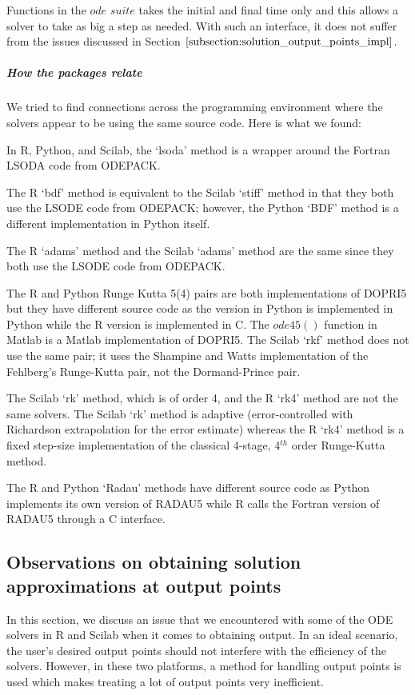 Functions in the $ode$ $suite$ takes the initial and final time only and this allows a solver to take as big a step as needed. With such an interface, it does not suffer from the issues discussed in Section $\ref{subsection:solution_output_points_impl}$. 

\subparagraph{How the packages relate}
We tried to find connections across the programming environment where the solvers appear to be using the same source code.
Here is what we found:

In R, Python, and Scilab, the `lsoda' method is a wrapper around the Fortran LSODA code from ODEPACK.

The R `bdf' method is equivalent to the Scilab `stiff' method in that they both use the LSODE code from ODEPACK; however, the Python `BDF' method is a different implementation in Python itself.

The R `adams' method and the Scilab `adams' method are the same since they both use the LSODE code from ODEPACK.

The R and Python Runge Kutta 5(4) pairs are both implementations of DOPRI5 but they have different source code as the version in Python is implemented in Python while the R version is implemented in C. The $ode45()$ function in Matlab is a Matlab implementation of DOPRI5. The Scilab `rkf' method does not use the same pair; it uses the Shampine and Watts implementation of the Fehlberg's Runge-Kutta pair, not the Dormand-Prince pair. 

The Scilab `rk' method, which is of order 4, and the R `rk4' method are not the same solvers. The Scilab `rk' method is adaptive (error-controlled with Richardson extrapolation for the error estimate) whereas the R `rk4' method is a fixed step-size implementation of the classical 4-stage, 4$^{th}$ order Runge-Kutta method.

The R and Python `Radau' methods have different source code as Python implements its own version of RADAU5 while R calls the Fortran version of RADAU5 through a C interface.

\subsection{Observations on obtaining solution approximations at output points}
\label{subsection:solution_output_points_impl}
In this section, we discuss an issue that we encountered with some of the ODE solvers in R and Scilab when it comes to obtaining output. In an ideal scenario, the user's desired output points should not interfere with the efficiency of the solvers. However, in these two platforms, a method for handling output points is used which makes treating a lot of output points very inefficient.

